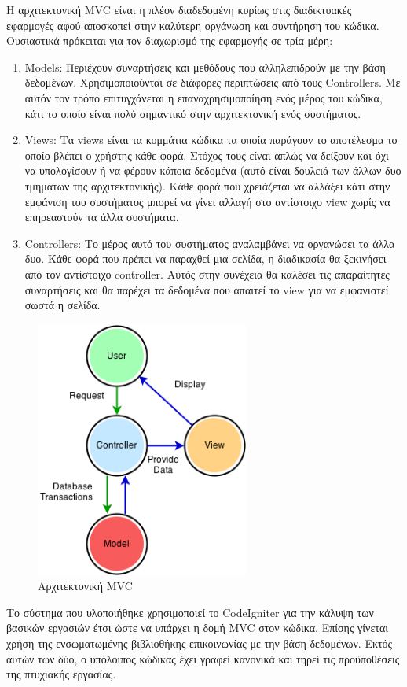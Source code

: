 Η αρχιτεκτονική MVC είναι η πλέον διαδεδομένη κυρίως στις διαδικτυακές εφαρμογές αφού αποσκοπεί στην καλύτερη οργάνωση και συντήρηση του κώδικα. Ουσιαστικά πρόκειται για τον διαχωρισμό της εφαρμογής σε τρία μέρη:
\begin{enumerate}
\item Models: Περιέχουν συναρτήσεις και μεθόδους που αλληλεπιδρούν με την βάση δεδομένων. Χρησιμοποιούνται σε διάφορες περιπτώσεις από τους Controllers. Με αυτόν τον τρόπο επιτυγχάνεται η επαναχρησιμοποίηση ενός μέρος του κώδικα, κάτι το οποίο είναι πολύ σημαντικό στην αρχιτεκτονική ενός συστήματος.
\item Views: Τα views είναι τα κομμάτια κώδικα τα οποία παράγουν το αποτέλεσμα το οποίο βλέπει ο χρήστης κάθε φορά. Στόχος τους είναι απλώς να δείξουν και όχι να υπολογίσουν ή να φέρουν κάποια δεδομένα (αυτό είναι δουλειά των άλλων δυο τμημάτων της αρχιτεκτονικής). Κάθε φορά που χρειάζεται να αλλάξει κάτι στην εμφάνιση του συστήματος μπορεί να γίνει αλλαγή στο αντίστοιχο view χωρίς να επηρεαστούν τα άλλα συστήματα. 
\item Controllers: Το μέρος αυτό του συστήματος αναλαμβάνει να οργανώσει τα άλλα δυο. Κάθε φορά που πρέπει να παραχθεί μια σελίδα, η διαδικασία θα ξεκινήσει από τον αντίστοιχο controller. Αυτός στην συνέχεια θα καλέσει τις απαραίτητες συναρτήσεις και θα παρέχει τα δεδομένα που απαιτεί το view για να εμφανιστεί σωστά η σελίδα.
\end{enumerate}

\begin{figure}
\centering
\includegraphics[width=70mm]{images/mvc.png}
\caption{Αρχιτεκτονική MVC}
\label{mvc}
\end{figure}

Το σύστημα που υλοποιήθηκε χρησιμοποιεί το CodeIgniter για την κάλυψη των βασικών εργασιών έτσι ώστε να υπάρχει η δομή MVC στον κώδικα. Επίσης γίνεται χρήση της ενσωματωμένης βιβλιοθήκης επικοινωνίας με την βάση δεδομένων. Εκτός αυτών των δύο, ο υπόλοιπος κώδικας έχει γραφεί κανονικά και τηρεί τις προϋποθέσεις της πτυχιακής εργασίας.

